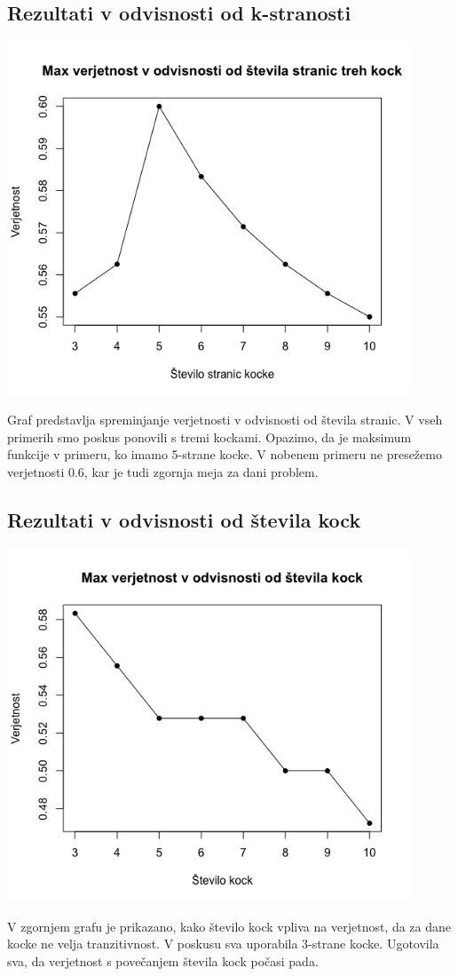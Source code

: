\documentclass[12pt,a4paper]{amsart}
\begin{document}
 \subsection{Rezultati v odvisnosti od k-stranosti}
 \begin{center}
    \includegraphics*[width=120mm]{st_stranic.png}
 \end{center}
 Graf predstavlja spreminjanje verjetnosti v odvisnosti od števila stranic. V vseh primerih smo poskus ponovili s tremi kockami. Opazimo, da je maksimum funkcije v primeru, ko imamo 5-strane kocke. V nobenem primeru ne presežemo verjetnosti 0.6, kar je tudi zgornja meja za dani problem.
 
 \subsection{Rezultati v odvisnosti od števila kock}
\begin{center}
    \includegraphics*[width=120mm]{st_kock.png}
\end{center}
V zgornjem grafu je prikazano, kako število kock vpliva na verjetnost, da za dane kocke ne velja tranzitivnost. V poskusu sva uporabila 3-strane kocke. Ugotovila sva, da verjetnost s povečanjem števila kock počasi pada.
\end{document}
